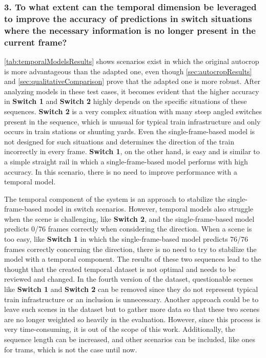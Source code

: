 \subsubsection{3. To what extent can the temporal dimension be leveraged to improve the accuracy of predictions in switch situations where the necessary information is no longer present in the current frame?}

\autoref{tab:temporalModelsResults} shows scenarios exist in which the original autocrop is more advantageous than the adapted one, even though \autoref{sec:autocropResults} and \autoref{sec:qualitativeComparison} prove that the adapted one is more robust.
After analyzing models in these test cases, it becomes evident that the higher accuracy in \textbf{Switch 1} and \textbf{Switch 2} highly depends on the specific situations of these sequences.
\textbf{Switch 2} is a very complex situation with many steep angled switches present in the sequence, which is unusual for typical train infrastructure and only occurs in train stations or shunting yards.
Even the single-frame-based model is not designed for such situations and determines the direction of the train incorrectly in every frame.
\textbf{Switch 1}, on the other hand, is easy and is similar to a simple straight rail in which a single-frame-based model performs with high accuracy.
In this scenario, there is no need to improve performance with a temporal model.

The temporal component of the system is an approach to stabilize the single-frame-based model in switch scenarios.
However, temporal models also struggle when the scene is challenging, like \textbf{Switch 2}, and the single-frame-based model predicts 0/76 frames correctly when considering the direction.
When a scene is too easy, like \textbf{Switch 1} in which the single-frame-based model predicts 76/76 frames correctly concerning the direction, there is no need to try to stabilize the model with a temporal component.
The results of these two sequences lead to the thought that the created temporal dataset is not optimal and needs to be reviewed and changed.
In the fourth version of the dataset, questionable scenes like \textbf{Switch 1} and \textbf{Switch 2} can be removed since they do not represent typical train infrastructure or an inclusion is unnecessary.
Another approach could be to leave such scenes in the dataset but to gather more data so that these two scenes are no longer weighted so heavily in the evaluation.
However, since this process is very time-consuming, it is out of the scope of this work.
Additionally, the sequence length can be increased, and other scenarios can be included, like ones for trams, which is not the case until now.

